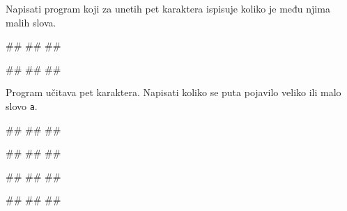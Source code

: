 \begin{Exercise}[label=p1.2_07] 
Napisati program koji za unetih pet karaktera ispisuje koliko je među njima malih slova.

\begin{miditest}
\begin{upotreba}{1}
#\naslovInt#
##
##
\end{upotreba}
\end{miditest}
\begin{miditest}
\begin{upotreba}{2}
#\naslovInt#
##
##
\end{upotreba}
\end{miditest}

\end{Exercise}
\ifresenja
 \begin{Answer}[ref=p1.2_07]
\end{Answer}
\fi


\begin{Exercise}[label=p1.6_] 
Program učitava pet karaktera. Napisati koliko
se puta pojavilo veliko ili malo slovo \verb|a|. 

\begin{miditest}
\begin{upotreba}{1}
#\naslovInt#
##
##
\end{upotreba}
\end{miditest}
\begin{miditest}
\begin{upotreba}{2}
#\naslovInt#
##
##
\end{upotreba}
\end{miditest}

\begin{miditest}
\begin{upotreba}{3}
#\naslovInt#
##
##
\end{upotreba}
\end{miditest}
\begin{miditest}
\begin{upotreba}{4}
#\naslovInt#
##
##
\end{upotreba}
\end{miditest}
\end{Exercise}
\ifresenja
 \begin{Answer}[ref=p1.6_]
\end{Answer}
\fi


